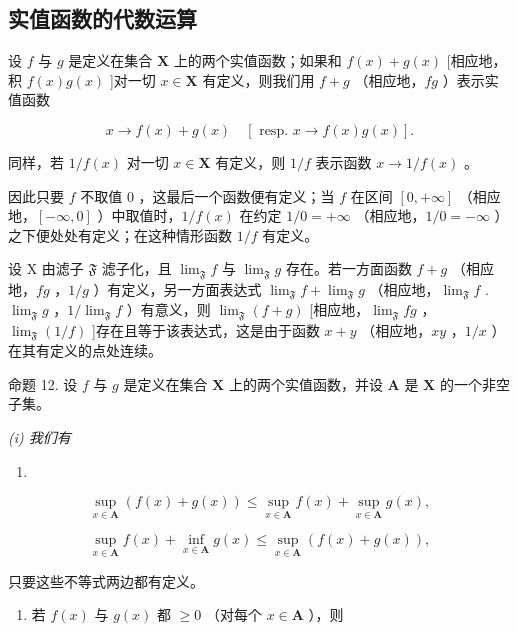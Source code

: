 \subsection{实值函数的代数运算}

设 \(f\) 与 \(g\) 是定义在集合 \(\mathbf{X}\) 上的两个实值函数；如果和 \(f(x) + g(x)\) {[}相应地，积 \(f(x)g(x)\) {]}对一切 \(x \in \mathbf{X}\) 有定义，则我们用 \(f + g\) （相应地，\(fg\) ）表示实值函数

\[
x \rightarrow f (x) + g (x) \quad [ \text { resp. } x \rightarrow f (x) g (x) ].
\]

同样，若 \(1 / f(x)\) 对一切 \(x\in \mathbf{X}\) 有定义，则 \(1 / f\) 表示函数 \(x\to 1 / f(x)\) 。

因此只要 \(f\) 不取值 \(0\) ，这最后一个函数便有定义；当 \(f\) 在区间 \([0, +\infty]\) （相应地，\([-\infty, 0]\) ）中取值时，\(1/f(x)\) 在约定 \(1/0 = +\infty\) （相应地，\(1/0 = -\infty\) ）之下便处处有定义；在这种情形函数 \(1/f\) 有定义。

设 X 由滤子 \(\mathfrak{F}\) 滤子化，且 \(\lim_{\mathfrak{F}} f\) 与 \(\lim_{\mathfrak{F}} g\) 存在。若一方面函数 \(f + g\) （相应地，\(fg\) ，\(1/g\) ）有定义，另一方面表达式 \(\lim_{\mathfrak{F}} f + \lim_{\mathfrak{F}} g\) （相应地，\(\lim_{\mathfrak{F}} f\) . \(\lim_{\mathfrak{F}} g\) ，\(1/\lim_{\mathfrak{F}} f\) ）有意义，则 \(\lim_{\mathfrak{F}} (f + g)\) {[}相应地，\(\lim_{\mathfrak{F}} fg\) ，\(\lim_{\mathfrak{F}} (1/f)\) {]}存在且等于该表达式，这是由于函数 \(x + y\) （相应地，\(xy\) ，\(1/x\) ）在其有定义的点处连续。

命题 12. 设 \(f\) 与 \(g\) 是定义在集合 \(\mathbf{X}\) 上的两个实值函数，并设 \(\mathbf{A}\) 是 \(\mathbf{X}\) 的一个非空子集。

\textit{(i) 我们有}

\begin{enumerate}
\def\labelenumi{(\arabic{enumi})}
\setcounter{enumi}{16}
\tightlist
\item
\end{enumerate}

\[
\sup _ {x \in \mathbf {A}} (f (x) + g (x)) \leqslant \sup _ {x \in \mathbf {A}} f (x) + \sup _ {x \in \mathbf {A}} g (x),\tag{17}
\]

\[
\sup _ {x \in \mathbf {A}} f (x) + \inf _ {x \in \mathbf {A}} g (x) \leqslant \sup _ {x \in \mathbf {A}} (f (x) + g (x)),\tag{18}
\]

只要这些不等式两边都有定义。

\begin{enumerate}
\def\labelenumi{(\roman{enumi})}
\setcounter{enumi}{1}
\tightlist
\item
  若 \(f(x)\) 与 \(g(x)\) 都 \(\geqslant 0\) （对每个 \(x \in \mathbf{A}\) ），则
\end{enumerate}

